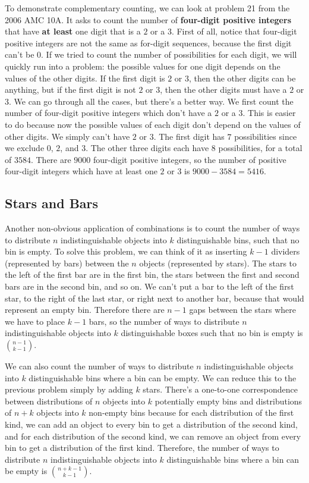 \documentclass[twocolumn]{article}
\begin{document}
To demonstrate complementary counting, we can look at problem 21 from the 2006 
AMC 10A. It asks to count the number of \textbf{four-digit positive integers} 
that have \textbf{at least} one digit that is a $2$ or a $3$. First of all, 
notice that four-digit positive integers are not the same as for-digit 
sequences, because the first digit can't be $0$. If we tried to count the number 
of possibilities for each digit, we will quickly run into a problem: the 
possible values for one digit depends on the values of the other digits. If the 
first digit is $2$ or $3$, then the other digits can be anything, but if the 
first digit is not $2$ or $3$, then the other digits must have a $2$ or $3$. We 
can go through all the cases, but there's a better way. We first count the 
number of four-digit positive integers which don't have a $2$ or a $3$. This is 
easier to do because now the possible values of each digit don't depend on the 
values of other digits. We simply can't have $2$ or $3$. The first digit has $7$ 
possibilities since we exclude $0$, $2$, and $3$. The other three digits each 
have $8$ possibilities, for a total of $3584$. There are $9000$ four-digit 
positive integers, so the number of positive four-digit integers which have at 
least one $2$ or $3$ is $9000 - 3584 = 5416$.

\subsection*{Stars and Bars}
Another non-obvious application of combinations is to count the number of ways 
to distribute $n$ indistinguishable objects into $k$ distinguishable bins, such 
that no bin is empty. To solve this problem, we can think of it as inserting $k 
- 1$ dividers (represented by bars) between the $n$ objects (represented by 
stars). The stars to the left of the first bar are in the first bin, the stars 
between the first and second bars are in the second bin, and so on. We can't put 
a bar to the left of the first star, to the right of the last star, or right 
next to another bar, because that would represent an empty bin. Therefore there 
are $n - 1$ gaps between the stars where we have to place $k - 1$ bars, so the 
number of ways to distribute $n$ indistinguishable objects into $k$ 
distinguishable boxes such that no bin is empty is $\binom{n - 1}{k - 1}$.

We can also count the number of ways to distribute $n$ indistinguishable objects 
into $k$ distinguishable bins where a bin can be empty. We can reduce this to 
the previous problem simply by adding $k$ stars. There's a one-to-one 
correspondence between distributions of $n$ objects into $k$ potentially empty 
bins and distributions of $n + k$ objects into $k$ non-empty bins because for 
each distribution of the first kind, we can add an object to every bin to get a 
distribution of the second kind, and for each distribution of the second kind, 
we can remove an object from every bin to get a distribution of the first kind. 
Therefore, the number of ways to distribute $n$ indistinguishable objects into 
$k$ distinguishable bins where a bin can be empty is $\binom{n + k - 1}{k - 1}$.
\end{document}
